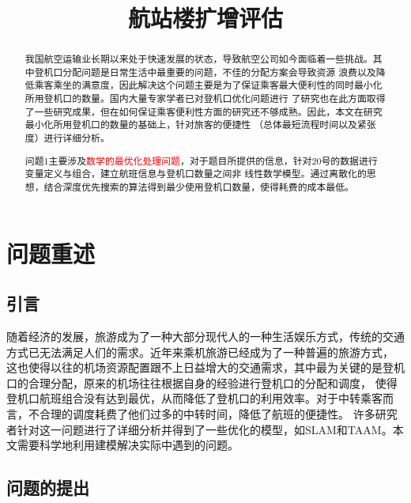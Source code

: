 \documentclass[bwprint]{gmcmthesis}
\title{航站楼扩增评估}
\begin{document}
 \maketitle

\begin{abstract}
我国航空运输业长期以来处于快速发展的状态，导致航空公司如今面临着一些挑战。其中登机口分配问题是日常生活中最重要的问题，不佳的分配方案会导致资源
浪费以及降低乘客乘坐的满意度，因此解决这个问题主要是为了保证乘客最大便利性的同时最小化所用登机口的数量。国内大量专家学者已对登机口优化问题进行
了研究也在此方面取得了一些研究成果，但在如何保证乘客便利性方面的研究还不够成熟。因此，本文在研究最小化所用登机口的数量的基础上，针对旅客的便捷性
（总体最短流程时间以及紧张度）进行详细分析。


问题1主要涉及\textcolor{red}{数学的最优化处理问题}，对于题目所提供的信息，针对20号的数据进行变量定义与组合，建立航班信息与登机口数量之间非
线性数学模型。通过离散化的思想，结合深度优先搜索的算法得到最少使用登机口数量，使得耗费的成本最低。



\end{abstract}

\pagestyle{plain}


\section{问题重述}

\subsection{引言}

随着经济的发展，旅游成为了一种大部分现代人的一种生活娱乐方式，传统的交通方式已无法满足人们的需求。近年来乘机旅游已经成为了一种普遍的旅游方式，
这也使得以往的机场资源配置跟不上日益增大的交通需求，其中最为关键的是登机口的合理分配，原来的机场往往根据自身的经验进行登机口的分配和调度，
使得登机口航班组合没有达到最优，从而降低了登机口的利用效率。对于中转乘客而言，不合理的调度耗费了他们过多的中转时间，降低了航班的便捷性。
许多研究者针对这一问题进行了详细分析并得到了一些优化的模型，如SLAM和TAAM。本文需要科学地利用建模解决实际中遇到的问题。

\subsection{问题的提出}
\end{document}
